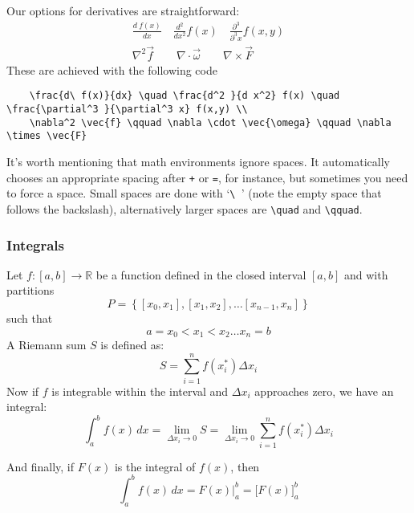 Our options for derivatives are straightforward:
\begin{align*}
    \frac{d\ f(x)}{dx} \quad \frac{d^2 }{d x^2} f(x) \quad \frac{\partial^3 }{\partial^3 x} f(x,y) \\
    \nabla^2 \vec{f} \qquad \nabla \cdot \vec{\omega} \qquad \nabla \times \vec{F}  
\end{align*}
These are achieved with the following code
\begin{lstlisting}
    \frac{d\ f(x)}{dx} \quad \frac{d^2 }{d x^2} f(x) \quad \frac{\partial^3 }{\partial^3 x} f(x,y) \\
    \nabla^2 \vec{f} \qquad \nabla \cdot \vec{\omega} \qquad \nabla \times \vec{F}  
\end{lstlisting}
It's worth mentioning that math environments ignore spaces.
It automatically chooses an appropriate spacing after \verb|+| or \verb|=|, for instance, but sometimes you need to force a space.
Small spaces are done with `\verb|\ |' (note the empty space that follows the backslash), alternatively larger spaces are \verb|\quad| and \verb|\qquad|.

\subsubsection{Integrals}
Let \( f: [a,b] \to \mathbb{R} \) be a function defined in the closed interval \( [a,b] \) and with partitions
\begin{equation*}
    P = \left \{ 
        [x_0,x_1], [x_1,x_2], \dots [x_{n-1},x_n]
     \right \}
\end{equation*}
such that
\begin{equation*}
    a = x_0 < x_1 < x_2 \dots x_n = b
\end{equation*}
A Riemann sum \( S \) is defined as:
\begin{equation}
    S = \sum_{i=1}^{n} f(x_i^*) \Delta x_i
\end{equation}
Now if \( f \) is integrable within the interval and \( \Delta x_i \) approaches zero, we have an integral:
\begin{equation}
    \int_a^b f(x) \,dx= \lim_{\Delta x_i \to 0}S = \lim_{\Delta x_i \to 0} \sum_{i=1}^{n} f(x_i^*) \Delta x_i 
\end{equation}

And finally, if \( F(x) \) is the integral of \( f(x) \), then
\begin{equation*}
    \int_a^b f(x) \,dx = F(x)\Big|_a^b = \Big[F(x)\Big]_a^b
\end{equation*}

